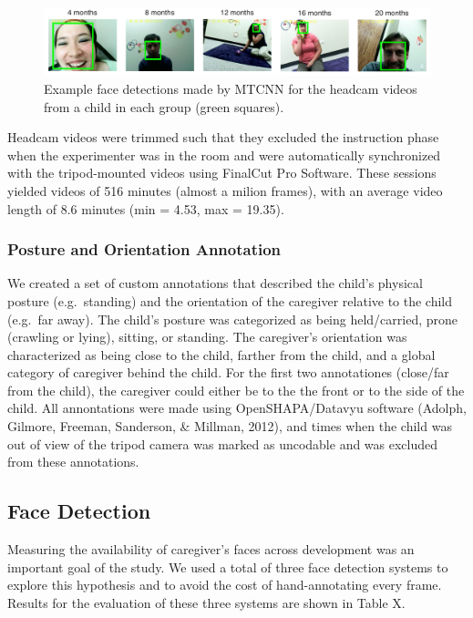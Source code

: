 \documentclass[10pt, letterpaper]{article}
\begin{document}
\begin{figure}
\includegraphics[width=6in]{images/framesample.pdf}
\caption{\label{fig:frames} Example face detections made by MTCNN for the headcam videos from a child in each group  (green squares).}
\end{figure}

Headcam videos were trimmed such that they excluded the instruction
phase when the experimenter was in the room and were automatically
synchronized with the tripod-mounted videos using FinalCut Pro Software.
These sessions yielded videos of 516 minutes (almost a milion frames),
with an average video length of 8.6 minutes (min = 4.53, max = 19.35).

\subsubsection{Posture and Orientation
Annotation}\label{posture-and-orientation-annotation}

We created a set of custom annotations that described the child's
physical posture (e.g.~standing) and the orientation of the caregiver
relative to the child (e.g.~far away). The child's posture was
categorized as being held/carried, prone (crawling or lying), sitting,
or standing. The caregiver's orientation was characterized as being
close to the child, farther from the child, and a global category of
caregiver behind the child. For the first two annotationes (close/far
from the child), the caregiver could either be to the the front or to
the side of the child. All annontations were made using
OpenSHAPA/Datavyu software (Adolph, Gilmore, Freeman, Sanderson, \&
Millman, 2012), and times when the child was out of view of the tripod
camera was marked as uncodable and was excluded from these annotations.

\subsection{Face Detection}\label{face-detection}

Measuring the availability of caregiver's faces across development was
an important goal of the study. We used a total of three face detection
systems to explore this hypothesis and to avoid the cost of
hand-annotating every frame. Results for the evaluation of these three
systems are shown in Table X.
\end{document}

